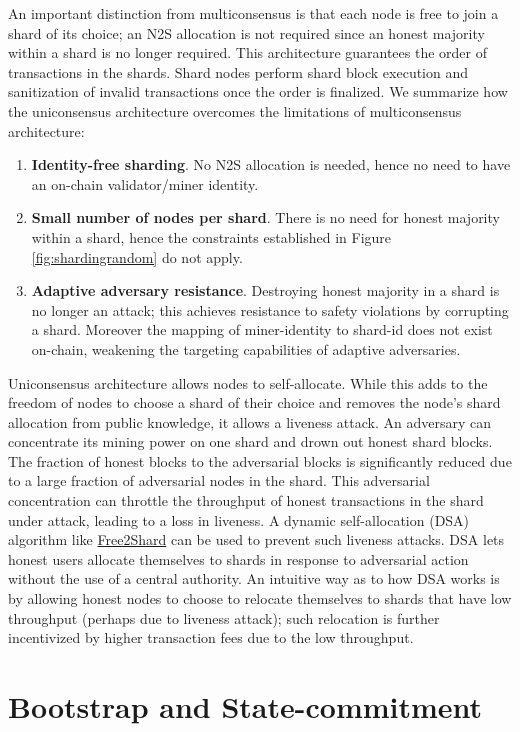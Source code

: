 \documentclass{article}
\begin{document}
An important distinction from multiconsensus is that each node is free to join a shard of its choice; an N2S allocation is not required since an honest majority within a shard is no longer required. This architecture guarantees the order of transactions in the shards. Shard nodes perform shard block execution and sanitization of invalid transactions once the order is finalized. 
We summarize how the uniconsensus architecture overcomes the limitations of multiconsensus architecture:
\begin{enumerate}
    \item {\bf Identity-free sharding}. No N2S allocation is needed, hence no need to have an  on-chain validator/miner identity. 
    \item {\bf Small number of nodes per shard}. There is no need for honest majority within a shard, hence the constraints established in Figure \ref{fig:shardingrandom} do not apply.
    \item {\bf Adaptive adversary resistance}. Destroying honest majority in a shard is no longer an attack; this achieves resistance to safety violations by corrupting a shard. Moreover the mapping of miner-identity to shard-id  does not exist on-chain, weakening the targeting capabilities of adaptive adversaries. 
\end{enumerate}

Uniconsensus architecture allows nodes to self-allocate. While this adds to the freedom of nodes to choose a shard of their choice and removes the node's shard allocation from public knowledge, it allows a liveness attack. An adversary can concentrate its mining power on one shard and drown out honest shard blocks. The fraction of honest blocks to the adversarial blocks is significantly reduced due to a large fraction of adversarial nodes in the shard. This adversarial concentration can throttle the throughput of honest transactions in the shard under attack, leading to a loss in liveness. A dynamic self-allocation (DSA) algorithm like \href{https://arxiv.org/abs/2005.09610}{Free2Shard} can be used to prevent  such liveness attacks. DSA lets honest users allocate themselves to shards in response to adversarial action without the use of a central authority. An intuitive way as to how DSA works is by allowing honest nodes to choose to relocate themselves to shards that have low throughput (perhaps due to liveness attack); such relocation is further incentivized by higher transaction fees due to the low throughput. 

\section{Bootstrap and State-commitment}
\end{document}
